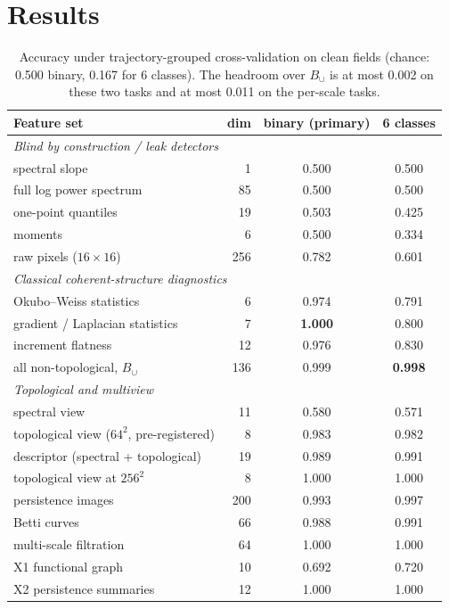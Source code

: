 \documentclass[11pt,a4paper]{article}
\begin{document}
\section{Results}

\begin{table}[t]
\centering
\small
\begin{tabular}{lrcc}
\toprule
Feature set & dim & binary (primary) & 6 classes \\
\midrule
\multicolumn{4}{l}{\emph{Blind by construction / leak detectors}}\\
spectral slope & 1 & 0.500 & 0.500 \\
full log power spectrum & 85 & 0.500 & 0.500 \\
one-point quantiles & 19 & 0.503 & 0.425 \\
moments & 6 & 0.500 & 0.334 \\
raw pixels ($16\times16$) & 256 & 0.782 & 0.601 \\
\midrule
\multicolumn{4}{l}{\emph{Classical coherent-structure diagnostics}}\\
Okubo--Weiss statistics & 6 & 0.974 & 0.791 \\
gradient / Laplacian statistics & 7 & \textbf{1.000} & 0.800 \\
increment flatness & 12 & 0.976 & 0.830 \\
all non-topological, $B_\cup$ & 136 & 0.999 & \textbf{0.998} \\
\midrule
\multicolumn{4}{l}{\emph{Topological and multiview}}\\
spectral view & 11 & 0.580 & 0.571 \\
topological view ($64^2$, pre-registered) & 8 & 0.983 & 0.982 \\
descriptor (spectral + topological) & 19 & 0.989 & 0.991 \\
topological view at $256^2$ & 8 & 1.000 & 1.000 \\
persistence images & 200 & 0.993 & 0.997 \\
Betti curves & 66 & 0.988 & 0.991 \\
multi-scale filtration & 64 & 1.000 & 1.000 \\
X1 functional graph & 10 & 0.692 & 0.720 \\
X2 persistence summaries & 12 & 1.000 & 1.000 \\
\bottomrule
\end{tabular}
\caption{Accuracy under trajectory-grouped cross-validation on clean fields
(chance: 0.500 binary, 0.167 for 6 classes). The headroom over $B_\cup$ is at
most 0.002 on these two tasks and at most 0.011 on the per-scale tasks.}
\label{tab:main}
\end{table}
\end{document}
